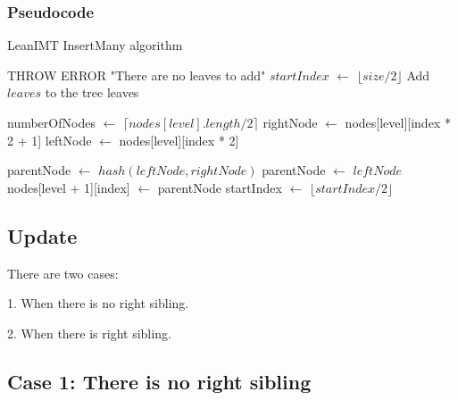 \documentclass{article}
\begin{document}
\bigbreak

\subsubsection{Pseudocode}

\begin{algorithm}[H]
    \caption{LeanIMT InsertMany algorithm}\label{insertMany}
    \begin{algorithmic}[1]
        \State THROW ERROR "There are no leaves to add"
        \EndIf
        \State $startIndex$ $\gets$ $\lfloor size/2 \rfloor$ 
        \State Add $leaves$ to the tree leaves

        \State numberOfNodes $\gets$ $\lceil nodes[level].length / 2 \rceil$ 
        \State rightNode $\gets$ nodes[level][index * 2 + 1] 
        \State leftNode $\gets$ nodes[level][index * 2] 

        \State parentNode $\gets$ $hash(leftNode, rightNode)$
        \Else
        \State parentNode $\gets$ $leftNode$
        \EndIf
        \State nodes[level + 1][index] $\gets$ parentNode 
        \EndFor
        \State startIndex $\gets$ $\lfloor startIndex/2 \rfloor$ 
        \EndFor
        \EndProcedure
    \end{algorithmic}
\end{algorithm}

\bigbreak

\subsection{Update}

There are two cases:

1. When there is no right sibling.

2. When there is right sibling.

\subsection*{Case 1: There is no right sibling}
\end{document}
